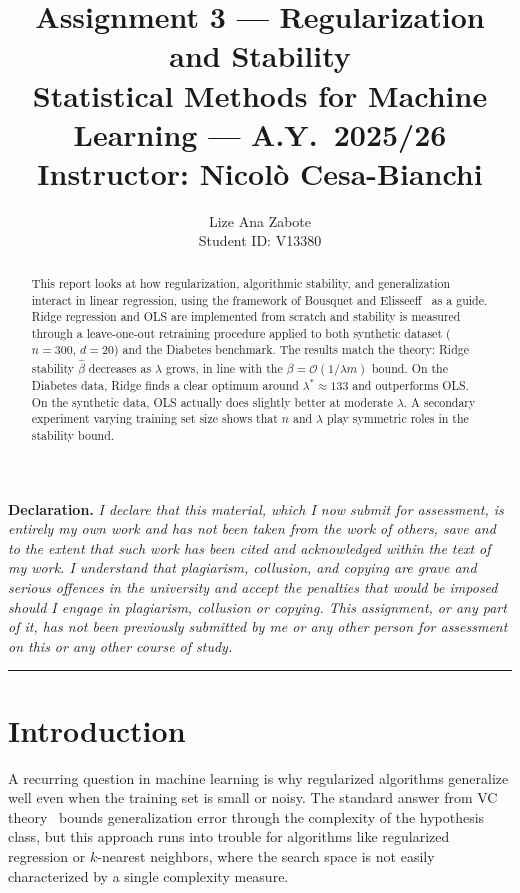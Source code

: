 \documentclass[11pt, a4paper, twoside]{article}
\title{%
    \vspace{-1em}%
    \textbf{Assignment 3 --- Regularization and Stability}\\[3pt]
    \normalsize Statistical Methods for Machine Learning --- A.Y.\ 2025/26\\
    \normalsize Instructor: Nicolò Cesa-Bianchi
}
\author{%
    Lize Ana Zabote\\
    \small Student ID: V13380 \quad
}
\date{}
\newcommand{\betahat}{\hat{\beta}}
\begin{document}

\maketitle
\vspace{-1em}

\noindent\textbf{Declaration.}
\textit{I declare that this material, which I now submit for assessment, is entirely my own
work and has not been taken from the work of others, save and to the extent that such work
has been cited and acknowledged within the text of my work. I understand that plagiarism,
collusion, and copying are grave and serious offences in the university and accept the
penalties that would be imposed should I engage in plagiarism, collusion or copying. This
assignment, or any part of it, has not been previously submitted by me or any other person
for assessment on this or any other course of study.}

\medskip

\begin{abstract}
\noindent
This report looks at how regularization, algorithmic stability, and generalization
interact in linear regression, using the framework of Bousquet and
Elisseeff~\cite{bousquet2002} as a guide.
Ridge regression and OLS are implemented from scratch and stability is measured through a leave-one-out
retraining procedure applied to both synthetic dataset ($n=300$, $d=20$) and the
Diabetes benchmark.
The results match the theory: Ridge stability $\betahat$ decreases as
$\lambda$ grows, in line with the $\beta = \mathcal{O}(1/\lambda m)$ bound.
On the Diabetes data, Ridge finds a clear optimum around $\lambda^* \approx 133$
and outperforms OLS. On the synthetic data, OLS actually does slightly better at
moderate $\lambda$.
A secondary experiment varying training set size shows that $n$ and $\lambda$ play
symmetric roles in the stability bound.
\end{abstract}

\medskip\noindent\rule{\linewidth}{0.4pt}\medskip

\section{Introduction}

A recurring question in machine learning is why regularized algorithms generalize
well even when the training set is small or noisy.
The standard answer from VC theory~\cite{vapnik1982} bounds generalization error
through the complexity of the hypothesis class, but this approach runs into trouble
for algorithms like regularized regression or $k$-nearest neighbors, where the search
space is not easily characterized by a single complexity measure.
\end{document}
